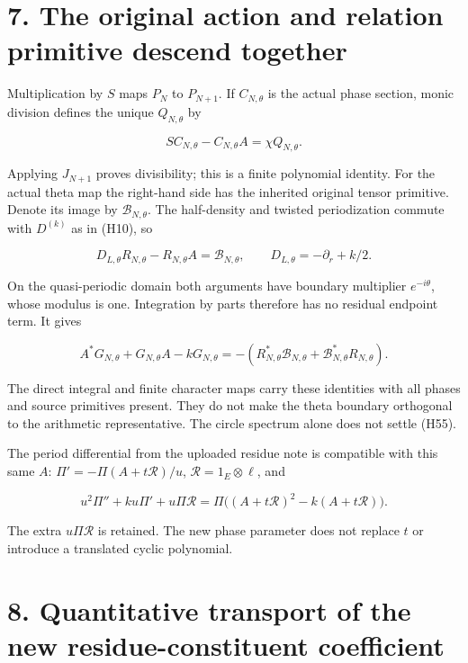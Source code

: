 \documentclass[
]{article}
\begin{document}
\section{7. The original action and relation primitive descend
together}\label{the-original-action-and-relation-primitive-descend-together}

Multiplication by \(S\) maps \(P_N\) to \(P_{N+1}\). If \(C_{N,\theta}\)
is the actual phase section, monic division defines the unique
\(Q_{N,\theta}\) by

\[
 SC_{N,\theta}-C_{N,\theta}A=\chi Q_{N,\theta}.
 \tag{H53}
\]

Applying \(J_{N+1}\) proves divisibility; this is a finite polynomial
identity. For the actual theta map the right-hand side has the inherited
original tensor primitive. Denote its image by
\(\mathscr B_{N,\theta}\). The half-density and twisted periodization
commute with \(D^{(k)}\) as in (H10), so

\[
 D_{L,\theta}R_{N,\theta}-R_{N,\theta}A=\mathscr B_{N,\theta},
 \qquad D_{L,\theta}=-\partial_r+k/2.
 \tag{H54}
\]

On the quasi-periodic domain both arguments have boundary multiplier
\(e^{-i\theta}\), whose modulus is one. Integration by parts therefore
has no residual endpoint term. It gives

\[
 A^*G_{N,\theta}+G_{N,\theta}A-kG_{N,\theta}
 =-(R_{N,\theta}^*\mathscr B_{N,\theta}
       +\mathscr B_{N,\theta}^*R_{N,\theta}).
 \tag{H55}
\]

The direct integral and finite character maps carry these identities
with all phases and source primitives present. They do not make the
theta boundary orthogonal to the arithmetic representative. The circle
spectrum alone does not settle (H55).

The period differential from the uploaded residue note is compatible
with this same \(A\): \(\Pi'= -\Pi(A+t\mathcal R)/u\),
\(\mathcal R=1_E\otimes\ell\), and

\[
 u^2\Pi''+ku\Pi'+u\Pi\mathcal R
 =\Pi\bigl((A+t\mathcal R)^2-k(A+t\mathcal R)\bigr).
 \tag{H56}
\]

The extra \(u\Pi\mathcal R\) is retained. The new phase parameter does
not replace \(t\) or introduce a translated cyclic polynomial.

\section{8. Quantitative transport of the new residue-constituent
coefficient}\label{quantitative-transport-of-the-new-residue-constituent-coefficient}
\end{document}
